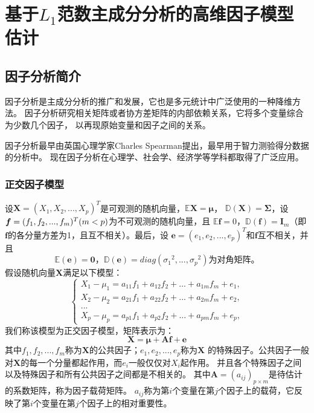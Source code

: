 \section{基于$L_1$范数主成分分析的高维因子模型估计}\label{chapter3}

\subsection{因子分析简介}
因子分析是主成分分析的推广和发展，它也是多元统计中广泛使用的一种降维方法。
因子分析研究相关矩阵或者协方差矩阵的内部依赖关系，它将多个变量综合为少数几个因子，
以再现原始变量和因子之间的关系。

因子分析最早由英国心理学家Charles Spearman提出，最早用于智力测验得分数据的分析中。
现在因子分析在心理学、社会学、经济学等学科都取得了广泛应用。
\subsubsection{正交因子模型}

设$\bm{X} = (X_1, X_2, ..., X_p)^T$是可观测的随机向量，$\mathbb{E}\bm{X} = \bm{\mu}$，
$\mathbb{D}(\bm{X}) = \bm{\Sigma}$，设$\bm{f} = (f_1, f_2, ..., f_m)^T\\ (m <p)$为不可观测的随机向量，且
$\mathbb{E}\bm{f} = 0$，$\mathbb{D}(\bm{f}) = \bm{I}_m$（即$\bm{f}$的各分量方差为1，且互不相关）。最后，设
$\bm{e} = (e_1, e_2, ..., e_p)^T$和$\bm{f}$互不相关，并且
$$
    \mathbb{E}(\bm{e}) = \bm{0}\mbox{，}\mathbb{D}(\bm{e}) = diag({\sigma _1}^2, ..., {\sigma _p}^2)
    \mbox{为对角矩阵。}
$$
假设随机向量$\bm{X}$满足以下模型：
\begin{equation*}
\left\{
\begin{array}{clr}
    X_1 - \mu_1 = a_{11}f_1 + a_{12}f_2 + ... + a_{1m}f_m + e_1, \\
    X_2 - \mu_2 = a_{21}f_1 + a_{22}f_2 + ... + a_{2m}f_m + e_2, \\
    ... \\
    X_p - \mu_p = a_{p1}f_1 + a_{p2}f_2 + ... + a_{pm}f_m + e_p,
\end{array}
\right.
\end{equation*}
我们称该模型为正交因子模型，矩阵表示为：
\begin{equation}
    \bm{X} = \bm{\mu} + \bm{A}\bm{f} + \bm{e}
\end{equation}
其中$f_1, f_2, ..., f_m$称为$\bm{X}$的公共因子；$e_1, e_2, ..., e_p$称为$\bm{X}$
的特殊因子。公共因子一般对$\bm{X}$的每一个分量都起作用，而$e_i$一般仅仅对$X_i$起作用。
并且各个特殊因子之间以及特殊因子和所有公共因子之间都是不相关的。
其中$\bm{A} = (a_{ij})_{p \times m}$是待估计的系数矩阵，称为因子载荷矩阵。
$a_{ij}$称为第$i$个变量在第$j$个因子上的载荷，它反映了第$i$个变量在第$j$个因子上的相对重要性。

